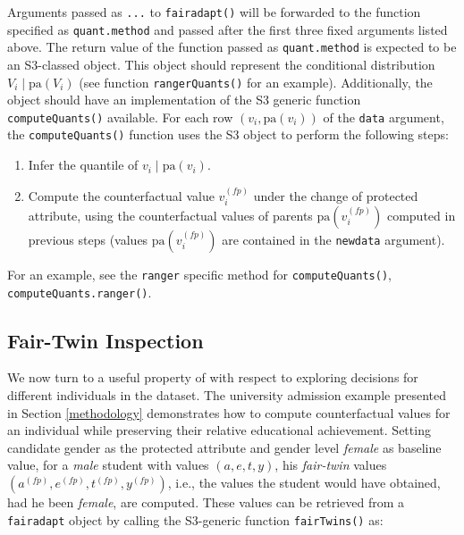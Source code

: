 \documentclass[
  nojss]{jss}
\providecommand{\tightlist}{%
  \setlength{\itemsep}{0pt}\setlength{\parskip}{0pt}}
\begin{document}
Arguments passed as \texttt{...} to \texttt{fairadapt()} will be
forwarded to the function specified as \texttt{quant.method} and passed
after the first three fixed arguments listed above. The return value of
the function passed as \texttt{quant.method} is expected to be an
S3-classed object. This object should represent the conditional
distribution \(V_i \mid \mathrm{pa}(V_i)\) (see function
\texttt{rangerQuants()} for an example). Additionally, the object should
have an implementation of the S3 generic function
\texttt{computeQuants()} available. For each row
\((v_i, \mathrm{pa}(v_i))\) of the \texttt{data} argument, the
\texttt{computeQuants()} function uses the S3 object to perform the
following steps:

\begin{enumerate}
\def\labelenumi{(\roman{enumi})}
\tightlist
\item
  Infer the quantile of \(v_i \mid \mathrm{pa}(v_i)\).
\item
  Compute the counterfactual value \( {v}^{(fp)}_i\) under the change of
  protected attribute, using the counterfactual values of parents
  \(\mathrm{pa}( {v}^{(fp)}_i)\) computed in previous steps (values
  \(\mathrm{pa}( {v}^{(fp)}_i)\) are contained in the \texttt{newdata}
  argument).
\end{enumerate}

For an example, see the \texttt{ranger} specific method for
\texttt{computeQuants()}, \texttt{computeQuants.ranger()}.

\hypertarget{fair-twin-inspection}{%
\subsection{Fair-Twin Inspection}\label{fair-twin-inspection}}

We now turn to a useful property of  with respect to
exploring decisions for different individuals in the dataset. The
university admission example presented in Section \ref{methodology}
demonstrates how to compute counterfactual values for an individual
while preserving their relative educational achievement. Setting
candidate gender as the protected attribute and gender level
\emph{female} as baseline value, for a \emph{male} student with values
\((a, e, t, y)\), his \emph{fair-twin} values
\(( {a}^{(fp)},  {e}^{(fp)},  {t}^{(fp)},  {y}^{(fp)})\), i.e., the
values the student would have obtained, had he been \emph{female}, are
computed. These values can be retrieved from a \texttt{fairadapt} object
by calling the S3-generic function \texttt{fairTwins()} as:
\end{document}
